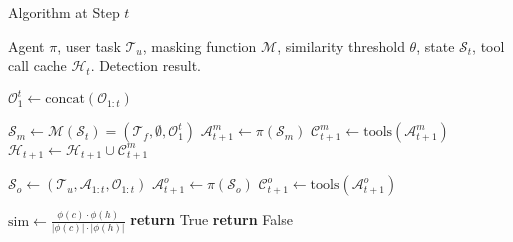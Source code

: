 \begin{algorithm}[t]
\caption{\method Algorithm at Step $t$}
\label{alg:detection}
\begin{algorithmic}[1]
\REQUIRE Agent $\pi$, user task $\mathcal{T}_u$, masking function $\mathcal{M}$, similarity threshold $\theta$, state $\mathcal{S}_t$, tool call cache $\mathcal{H}_{t}$.
\ENSURE Detection result.

\STATE $\mathcal{O}_1^t \leftarrow \text{concat}(\mathcal{O}_{1:t})$ 

\STATE $\mathcal{S}_m \leftarrow \mathcal{M}(\mathcal{S}_t) = (\mathcal{T}_f, \emptyset, \mathcal{O}_1^t)$ 
\STATE $\mathcal{A}_{t+1}^m \leftarrow \pi(\mathcal{S}_m)$ 
\STATE $\mathcal{C}_{t+1}^m \leftarrow \text{tools}(\mathcal{A}_{t+1}^m)$ 
\STATE $\mathcal{H}_{t+1} \leftarrow \mathcal{H}_{t+1} \cup \mathcal{C}_{t+1}^m$ 

\STATE $\mathcal{S}_o \leftarrow (\mathcal{T}_u, \mathcal{A}_{1:t}, \mathcal{O}_{1:t})$ 
\STATE $\mathcal{A}_{t+1}^o \leftarrow \pi(\mathcal{S}_o)$ 
\STATE $\mathcal{C}_{t+1}^o \leftarrow \text{tools}(\mathcal{A}_{t+1}^o)$ 

        \STATE $\text{sim} \leftarrow \frac{\phi(c) \cdot \phi(h)}{|\phi(c)| \cdot |\phi(h)|}$ 
            \STATE \textbf{return} True 
        \ENDIF
    \ENDFOR
\ENDFOR
\STATE \textbf{return} False 
\end{algorithmic}

\end{algorithm}




